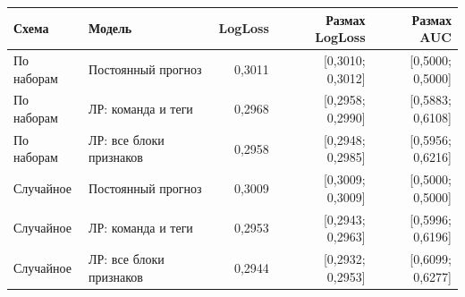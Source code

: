 \begin{tabular}{@{}l>{\raggedright\arraybackslash}p{4.4cm}rrr@{}}
\toprule
Схема & Модель & LogLoss & Размах LogLoss & Размах AUC \\
\midrule
По наборам & Постоянный прогноз & 0,3011 & [0,3010; 0,3012] & [0,5000; 0,5000] \\
По наборам & ЛР: команда и теги & 0,2968 & [0,2958; 0,2990] & [0,5883; 0,6108] \\
По наборам & ЛР: все блоки признаков & 0,2958 & [0,2948; 0,2985] & [0,5956; 0,6216] \\
Случайное & Постоянный прогноз & 0,3009 & [0,3009; 0,3009] & [0,5000; 0,5000] \\
Случайное & ЛР: команда и теги & 0,2953 & [0,2943; 0,2963] & [0,5996; 0,6196] \\
Случайное & ЛР: все блоки признаков & 0,2944 & [0,2932; 0,2953] & [0,6099; 0,6277] \\
\bottomrule
\end{tabular}
